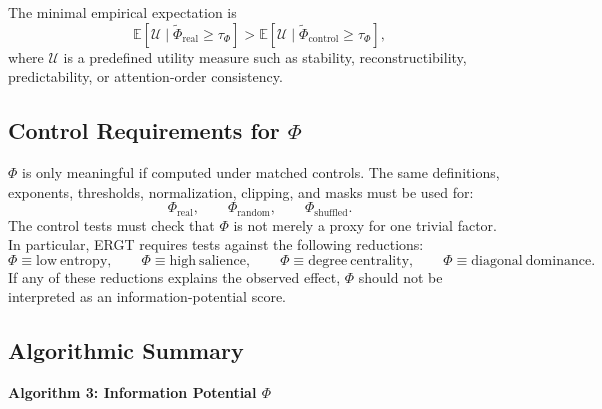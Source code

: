 \documentclass[11pt]{article}
\begin{document}
The minimal empirical expectation is
\[
\mathbb{E}[\mathcal{U}\mid\widetilde{\Phi}_{\mathrm{real}}\geq\tau_{\Phi}]
>
\mathbb{E}[\mathcal{U}\mid\widetilde{\Phi}_{\mathrm{control}}\geq\tau_{\Phi}],
\]
where $\mathcal{U}$ is a predefined utility measure such as stability, reconstructibility, predictability, or attention-order consistency.

\subsection{Control Requirements for $\Phi$}

$\Phi$ is only meaningful if computed under matched controls. The same definitions, exponents, thresholds, normalization, clipping, and masks must be used for:
\[
\Phi_{\mathrm{real}},
\qquad
\Phi_{\mathrm{random}},
\qquad
\Phi_{\mathrm{shuffled}}.
\]
The control tests must check that $\Phi$ is not merely a proxy for one trivial factor. In particular, ERGT requires tests against the following reductions:
\[
\Phi\equiv \mathrm{low\ entropy},
\qquad
\Phi\equiv \mathrm{high\ salience},
\qquad
\Phi\equiv \mathrm{degree\ centrality},
\qquad
\Phi\equiv \mathrm{diagonal\ dominance}.
\]
If any of these reductions explains the observed effect, $\Phi$ should not be interpreted as an information-potential score.

\subsection{Algorithmic Summary}

\noindent\textbf{Algorithm 3: Information Potential $\Phi$}
\end{document}
